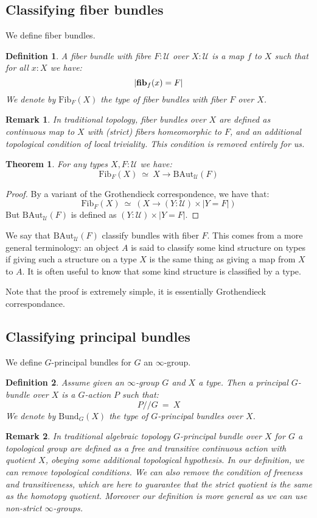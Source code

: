 \documentclass{article}
\newcommand{\sse}[1]{\medbreak \subsection{#1}}
\newcommand{\U}{{\mathcal U}}
\renewcommand{\r}{\rightarrow}
\newcommand{\fib}{\mathrm{\bf fib}}
\newcommand{\B}{\mathrm{B}}
\newcommand{\Aut}{\mathrm{Aut}}
\newtheorem{definition}{Definition}
\newtheorem{theorem}{Theorem}
\newtheorem{remark}{Remark}
\begin{document}
\sse{Classifying fiber bundles}

We define fiber bundles.

\begin{definition}
A fiber bundle with fibre $F:\U$ over $X:\U$ is a map $f$ to $X$ such that for all $x:X$ we have:
\[| \fib_f(x)=F| \]
We denote by $\mathrm{Fib}_F(X)$ the type of fiber bundles with fiber $F$ over $X$.
\end{definition}

\begin{remark}
In traditional topology, fiber bundles over $X$ are defined as continuous map to $X$ with (strict) fibers homeomorphic to $F$, and an additional topological condition of \emph{local triviality}. This condition is removed entirely for us.
\end{remark}

\begin{theorem}
For any types $X,F:\U$ we have:
\[\mathrm{Fib}_F(X) \ \simeq \ X\r \B\Aut_\U(F)\]
\end{theorem}
\begin{proof}
By a variant of the Grothendieck correspondence, we have that:
\[\mathrm{Fib}_F(X) \ \simeq \ (X\r (Y:\U)\times|Y=F|)\]
But $\B\Aut_\U(F)$ is defined as $(Y:\U)\times |Y=F|$.
\end{proof}

We say that $\B \Aut_\U(F)$ classify bundles with fiber $F$. This comes from a more general terminology: an object $A$ is said to classify some kind structure on types if giving such a structure on a type $X$ is the same thing as giving a map from $X$ to $A$. It is often useful to know that some kind structure is classified by a type.

Note that the proof is extremely simple, it is essentially Grothendieck correspondance.


\sse{Classifying principal bundles}

We define $G$-principal bundles for $G$ an $\infty$-group.

\begin{definition}
Assume given an $\infty$-group $G$ and $X$ a type. Then a principal $G$-bundle over $X$ is a $G$-action $P$ such that:
\[P//G \ = \ X\]
We denote by $\mathrm{Bund}_G(X)$ the type of $G$-principal bundles over $X$.
\end{definition}

\begin{remark}
In traditional algebraic topology $G$-principal bundle over $X$ for $G$ a topological group are defined as a free and transitive continuous action with quotient $X$, obeying some additional topological hypothesis. In our definition, we can remove topological conditions. We can also remove the condition of freeness and transitiveness, which are here to guarantee that the strict quotient is the same as the homotopy quotient. Moreover our definition is more general as we can use non-strict $\infty$-groups.
\end{remark}
\end{document}
